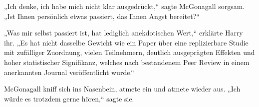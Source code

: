 „Ich denke, ich habe mich nicht klar ausgedrückt,“ sagte McGonagall sorgsam. „Ist Ihnen persönlich etwas passiert, das Ihnen Angst bereitet?“

„Was mir selbst passiert ist, hat lediglich anekdotischen Wert,“ erklärte Harry ihr. „Es hat nicht dasselbe Gewicht wie ein Paper über eine replizierbare Studie mit zufälliger Zuordnung, vielen Teilnehmern, deutlich ausgeprägten Effekten und hoher statistischer Signifikanz, welches nach bestandenem Peer Review in einem anerkannten Journal veröffentlicht wurde.“

McGonagall kniff sich ins Nasenbein, atmete ein und atmete wieder aus. „Ich würde es trotzdem gerne hören,“ sagte sie.

